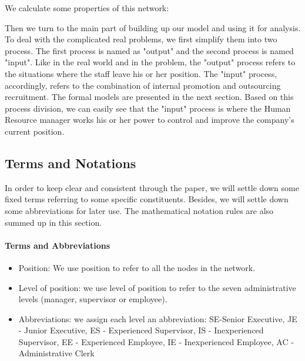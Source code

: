 \documentclass[tcn = 37075, sheet = false, abstract = false]{mcmthesis}
\begin{document}
We calculate some properties of this network:

Then we turn to the main part of building up our model and using it for analysis. To deal with the complicated real problems, we first simplify them into two process. The first process is named as "output" and the second process is named "input". Like in the real world and in the problem, the "output" process refers to the situations where the staff leave his or her position. The "input" process, accordingly, refers to the combination of internal promotion and outsourcing recruitment. The formal models are presented in the next section. Based on this process division, we can easily see that the "input" process is where the Human Resource manager works his or her power to control and improve the company's current position.

\subsection{Terms and Notations}

In order to keep clear and consistent through the paper, we will settle down some fixed terms referring to some specific constituents. Besides, we will settle down some abbreviations for later use. The mathematical notation rules are also summed up in this section.

\paragraph{Terms and Abbreviations}
\begin{itemize}
\item Position: We use position to refer to all the nodes in the network.
\item Level of position: we use level of position to refer to the seven administrative levels (manager, supervisor or employee).
\item Abbreviations: we assign each level an abbreviation: SE-Senior Executive, JE -  Junior Executive, ES - Experienced Supervisor, IS - Inexperienced Supervisor, EE - Experienced Employee, IE - Inexperienced Employee, AC - Administrative Clerk
\end{itemize}
\end{document}
